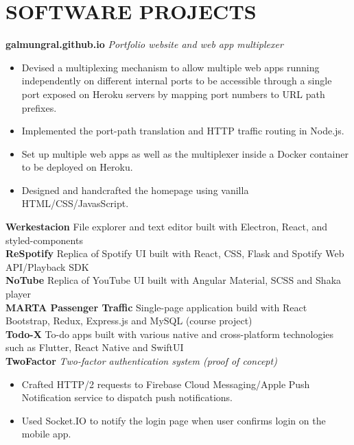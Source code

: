 \documentclass[11pt]{article}
\begin{document}
\section*{SOFTWARE PROJECTS}
\textbf{galmungral.github.io}  \enspace \textit{\color{gray} Portfolio website and web app multiplexer}
\begin{itemize}[leftmargin=15pt, noitemsep, topsep=0pt]
\item Devised a multiplexing mechanism to allow multiple web apps running independently on different internal ports to be accessible through a single port exposed on Heroku servers by mapping port numbers to URL path prefixes.
\item Implemented the port-path translation and HTTP traffic routing in Node.js.
\item Set up multiple web apps as well as the multiplexer inside a Docker container to be deployed on Heroku.
\item Designed and handcrafted the homepage using vanilla HTML/CSS/JavasScript.
\end{itemize}
\vspace{0.5em}
\textbf{Werkestacion} \enspace File explorer and text editor built with Electron, React, and styled-components\\
\textbf{ReSpotify} \enspace Replica of Spotify UI built with React, CSS, Flask and Spotify Web API/Playback SDK\\
\textbf{NoTube} \enspace Replica of YouTube UI built with Angular Material, SCSS and Shaka player\\
\textbf{MARTA Passenger Traffic} \enspace Single-page application build with React Bootstrap, Redux, Express.js and MySQL (course project)\\
\textbf{Todo-X} \enspace To-do apps built with various native and cross-platform technologies such as Flutter, React Native and SwiftUI\vspace{0.5em}\\
%
\textbf{TwoFactor} \enspace \textit{\color{gray} Two-factor authentication system (proof of concept)}
\begin{itemize}[leftmargin=15pt, noitemsep, topsep=0pt]
\item Crafted HTTP/2 requests to Firebase Cloud Messaging/Apple Push Notification service to dispatch push notifications.
\item Used Socket.IO to notify the login page when user confirms login on the mobile app.
\end{itemize}
\vspace{0.5em}
\end{document}
